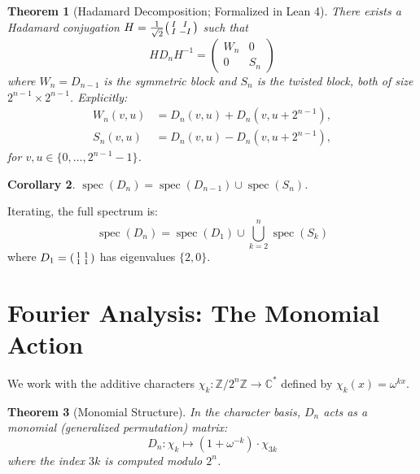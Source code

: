 \documentclass[11pt,reqno]{amsart}
\newtheorem{theorem}{Theorem}[section]
\newtheorem{corollary}[theorem]{Corollary}
\theoremstyle{definition}
\begin{document}
\begin{theorem}[Hadamard Decomposition; Formalized in Lean 4]\label{thm:hadamard}
There exists a Hadamard conjugation $H = \frac{1}{\sqrt{2}}\begin{psmallmatrix} I & I \\ I & -I \end{psmallmatrix}$ such that
\[
H D_n H^{-1} = \begin{pmatrix} W_n & 0 \\ 0 & S_n \end{pmatrix}
\]
where $W_n = D_{n-1}$ is the \emph{symmetric block} and $S_n$ is the \emph{twisted block}, both of size $2^{n-1} \times 2^{n-1}$. Explicitly:
\begin{align*}
W_n(v, u) &= D_n(v, u) + D_n(v, u + 2^{n-1}), \\
S_n(v, u) &= D_n(v, u) - D_n(v, u + 2^{n-1}),
\end{align*}
for $v, u \in \{0, \ldots, 2^{n-1} - 1\}$.
\end{theorem}

\begin{corollary}\label{cor:spec-decomp}
$\operatorname{spec}(D_n) = \operatorname{spec}(D_{n-1}) \cup \operatorname{spec}(S_n)$.
\end{corollary}

Iterating, the full spectrum is:
\[
\operatorname{spec}(D_n) = \operatorname{spec}(D_1) \cup \bigcup_{k=2}^{n} \operatorname{spec}(S_k)
\]
where $D_1 = \begin{psmallmatrix} 1 & 1 \\ 1 & 1 \end{psmallmatrix}$ has eigenvalues $\{2, 0\}$.

\section{Fourier Analysis: The Monomial Action}\label{sec:fourier}

We work with the additive characters $\chi_k \colon \mathbb{Z}/2^n\mathbb{Z} \to \mathbb{C}^*$ defined by $\chi_k(x) = \omega^{kx}$.

\begin{theorem}[Monomial Structure]\label{thm:monomial}
In the character basis, $D_n$ acts as a monomial (generalized permutation) matrix:
\[
D_n \colon \chi_k \mapsto (1 + \omega^{-k}) \cdot \chi_{3k}
\]
where the index $3k$ is computed modulo $2^n$.
\end{theorem}
\end{document}
